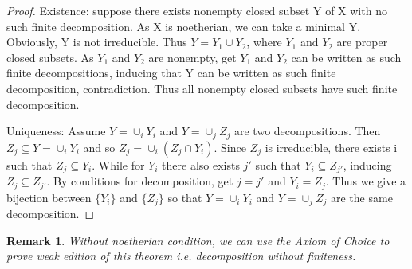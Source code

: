 \documentclass{ctexart}
\newtheorem{remark}{Remark}[section]
\begin{document}
\begin{proof}
    Existence: suppose there exists nonempty closed subset Y of X with no such finite decomposition.
    As X is noetherian, we can take a minimal Y.
    Obviously, Y is not irreducible.
    Thus $Y = Y_{1} \cup Y_{2}$, where $Y_{1}$ and $Y_{2}$ are proper closed subsets.
    As $Y_{1}$ and $Y_{2}$ are nonempty, get $Y_{1}$ and $Y_{2}$ can be written as such finite decompositions, inducing that Y can be written as such finite decomposition, contradiction.
    Thus all nonempty closed subsets have such finite decomposition.
    \par
    Uniqueness: Assume $Y = \cup_{i} Y_{i}$ and $Y = \cup_{j} Z_{j}$ are two decompositions.
    Then $Z_{j} \subseteq Y = \cup_{i} Y_{i}$ and so $Z_{j} = \cup_{i} (Z_{j} \cap Y_{i})$.
    Since $Z_{j}$ is irreducible, there exists i such that $Z_{j} \subseteq Y_{i}$.
    While for $Y_{i}$ there also exists $j'$ such that $Y_{i} \subseteq Z_{j'}$, inducing $Z_{j} \subseteq Z_{j'}$.
    By conditions for decomposition, get $j = j'$ and $Y_{i} = Z_{j}$.
    Thus we give a bijection between $\{Y_{i}\}$ and $\{Z_{j}\}$ so that $Y = \cup_{i} Y_{i}$ and $Y = \cup_{j} Z_{j}$ are the same decomposition.
\end{proof}
\begin{remark}
    Without noetherian condition, we can use the Axiom of Choice to prove weak edition of this theorem i.e. decomposition without finiteness.
\end{remark}
\end{document}
